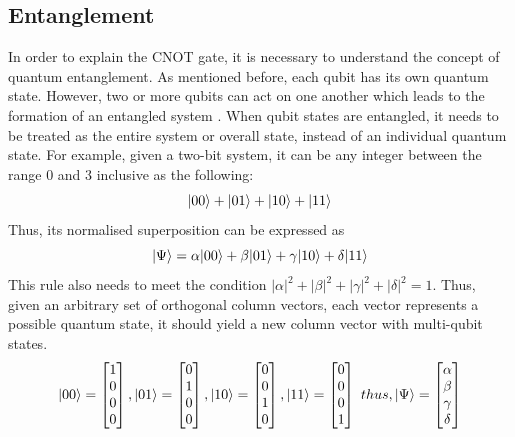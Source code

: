 \documentclass[12pt]{third-rep}
\begin{document}
\subsection{Entanglement}
In order to explain the CNOT gate, it is necessary to understand the concept of quantum entanglement. As mentioned before, each qubit has its own quantum state. However, two or more qubits can act on one another which leads to the formation of an entangled system \cite{entangle}. When qubit states are entangled, it needs to be treated as the entire system or overall state, instead of an individual quantum state. For example, given a two-bit system, it can be any integer between the range 0 and 3 inclusive as the following:
$${\left\vert{00}\right\rangle}+{\left\vert{01}\right\rangle}+{\left\vert{10}\right\rangle}+{\left\vert{11}\right\rangle}$$
Thus, its normalised superposition can be expressed as
$${\left\vert{\Psi}\right\rangle}=\alpha{\left\vert{00}\right\rangle}+\beta{\left\vert{01}\right\rangle}+\gamma{\left\vert{10}\right\rangle}+\delta{\left\vert{11}\right\rangle}$$
This rule also needs to meet the condition $|\alpha|^2+|\beta|^2+|\gamma|^2+|\delta|^2=1$. Thus, given an arbitrary set of orthogonal column vectors, each vector represents a possible quantum state, it should yield a new column vector with multi-qubit states.
\[
{\left\vert{00}\right\rangle}=
\begin{bmatrix}
    1 \\
    0 \\
    0 \\
    0
\end{bmatrix}
,{\left\vert{01}\right\rangle}=
\begin{bmatrix}
    0 \\
    1 \\
    0 \\
    0
\end{bmatrix}
,{\left\vert{10}\right\rangle}=
\begin{bmatrix}
    0 \\
    0 \\
    1 \\
    0
\end{bmatrix}
,{\left\vert{11}\right\rangle}=
\begin{bmatrix}
    0 \\
    0 \\
    0 \\
    1
\end{bmatrix}
\ thus, {\left\vert{\Psi}\right\rangle}=
\begin{bmatrix}
    \alpha \\
    \beta \\
    \gamma \\
    \delta
\end{bmatrix}
\]
\end{document}
